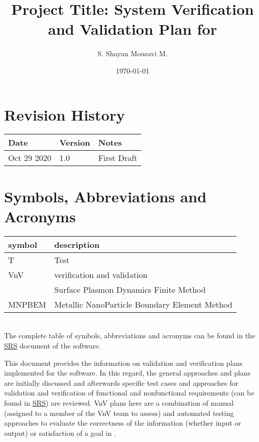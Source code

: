 \documentclass[12pt, titlepage]{article}
\begin{document}
\title{Project Title: System Verification and Validation Plan for \progname{}} 
\author{S. Shayan Mousavi M.}
\date{\today}
	
\maketitle


\section{Revision History}

\begin{tabularx}{\textwidth}{p{3cm}p{2cm}X}
\toprule {\bf Date} & {\bf Version} & {\bf Notes}\\
\midrule
Oct 29 2020& 1.0 & First Draft\\
\bottomrule
\end{tabularx}

\newpage

\tableofcontents

\listoftables


\newpage

\section{Symbols, Abbreviations and Acronyms}

\renewcommand{\arraystretch}{1.2}
\begin{tabular}{l l} 
  \toprule		
  \textbf{symbol} & \textbf{description}\\
  \midrule 
  T & Test\\
  VnV & verification and validation\\
  \progname{} & Surface Plasmon Dynamics Finite Method\\
  MNPBEM & Metallic NanoParticle Boundary Element Method\\
  \bottomrule
\end{tabular}\\
The complete table of symbols, abbreviations and acronyms can be found in the \href{https://github.com/shmouses/SPDFM/tree/master/docs/SRS}{SRS} document of the software. 
\newpage


This document provides the information on validation and verification plans implemented for the \progname{} software. In this regard, the general approaches and plans are initially discussed and afterwards specific test cases and approaches for validation and verification of functional and nonfunctional requirements (can be found in \href{https://github.com/shmouses/SPDFM/tree/master/docs/SRS}{SRS}) are reviewed. VnV plans here are a combination of manual (assigned to a member of the VnV team to assess) and automated testing approaches to evaluate the correctness of the information (whether input or output) or satisfaction of a goal in \progname{}.    
\end{document}
